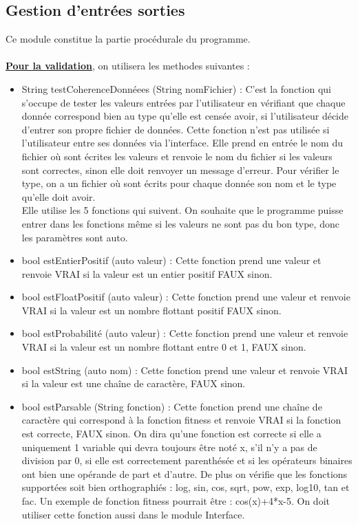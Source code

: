 \documentclass[a4paper,11pt]{article}
\begin{document}
		\subsection{Gestion d'entrées sorties}
			Ce module constitue la partie procédurale du programme.\\
			\\
			\underline{\bf Pour la validation}, on utilisera les methodes suivantes :\\
			\begin{itemize}
				\item String testCoherenceDonnéees (String nomFichier) : C’est la fonction qui s’occupe de tester les valeurs entrées par l’utilisateur en vérifiant que chaque donnée correspond bien au type qu’elle est censée avoir, si l'utilisateur décide d'entrer son propre fichier de données. Cette fonction n'est pas utilisée si l'utilisateur entre ses données via l'interface.
					Elle prend en entrée le nom du fichier où sont écrites les valeurs et renvoie le nom du fichier si les valeurs sont correctes, sinon elle doit renvoyer un message d’erreur. 
					Pour vérifier le type, on a un fichier où sont écrits pour chaque donnée son nom et le type qu’elle doit avoir.\\
					Elle utilise les 5 fonctions qui suivent. On souhaite que le programme puisse entrer dans les fonctions même si les valeurs ne sont pas du bon type, donc les paramètres sont auto.\vspace{0.2cm}
				\item bool estEntierPositif (auto valeur) : Cette fonction prend une valeur et renvoie VRAI si la valeur est un entier positif FAUX sinon.\vspace{0.2cm}
				\item bool estFloatPositif (auto valeur) : Cette fonction prend une valeur et renvoie VRAI si la valeur est un nombre flottant positif FAUX sinon.\vspace{0.2cm}
				\item bool estProbabilité (auto valeur) : Cette fonction prend une valeur et renvoie VRAI si la valeur est un nombre flottant entre 0 et 1, FAUX sinon.\vspace{0.2cm}
				\item bool estString (auto nom) : 	Cette fonction prend une valeur et renvoie VRAI si la valeur est une chaîne de caractère, FAUX sinon.\vspace{0.2cm}
				\item bool estParsable (String fonction) : Cette fonction prend une chaîne de caractère qui correspond à la fonction fitness et renvoie VRAI si la fonction est correcte, FAUX sinon. On dira qu’une fonction est correcte si elle a uniquement 1 variable qui devra toujours être noté x, s’il n’y a pas de division par 0, si elle est correctement parenthésée et si les opérateurs binaires ont bien une opérande de part et d’autre. De plus on vérifie que les fonctions supportées soit bien orthographiés : log, sin, cos, sqrt, pow, exp, log10, tan et fac.  Un exemple de fonction fitness pourrait être : cos(x)+4*x-5. On doit utiliser cette fonction aussi dans le module Interface.\\

\end{itemize}
\end{document}
